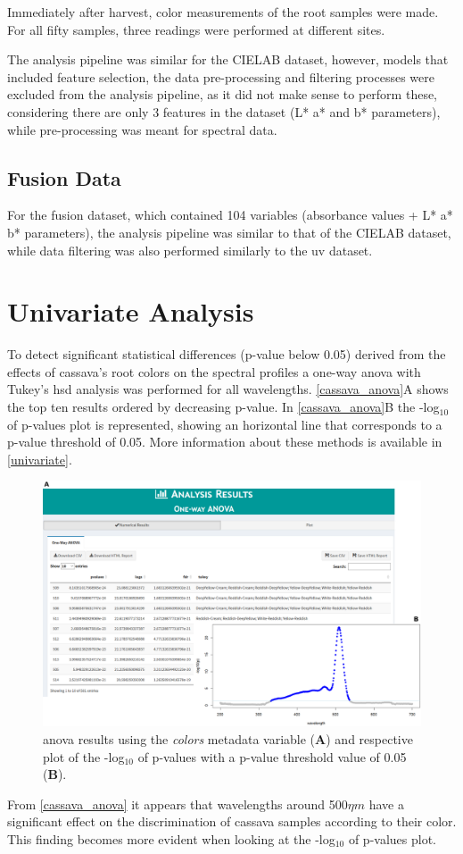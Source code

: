 Immediately after harvest, color measurements of the root samples were made. For all fifty samples, three readings were performed at different sites.

The analysis pipeline was similar for the CIELAB dataset, however, models that included feature selection, the data pre-processing and filtering processes were excluded from the analysis pipeline, as it did not make sense to perform these, considering there are only 3 features in the dataset (L* a* and b* parameters), while pre-processing was meant for spectral data.

\subsection{Fusion Data}

For the fusion dataset, which contained 104 variables (absorbance values + L* a* b* parameters), the analysis pipeline was similar to that of the CIELAB dataset, while data filtering was also performed similarly to the \gls{uv} dataset.


\section{Univariate Analysis}

To detect significant statistical differences (p-value below 0.05) derived from the effects of cassava's root colors on the spectral profiles a one-way \gls{anova} with Tukey's \gls{hsd} analysis was performed for all wavelengths. \autoref{cassava_anova}A shows the top ten results ordered by decreasing p-value. In \autoref{cassava_anova}B the -log$_{10}$ of p-values plot is represented, showing an horizontal line that corresponds to a p-value threshold of 0.05. More information about these methods is available in \autoref{univariate}.

\begin{figure}[h]
	\centering
	\includegraphics[width=1\linewidth]{Imagens/Case_study/anova_table_plot}
	\caption{\gls{anova} results using the \textit{colors} metadata variable (\textbf{A}) and respective plot of the -log$_{10}$ of p-values with a p-value threshold value of 0.05 (\textbf{B}).}
	\label{cassava_anova}
\end{figure}

From \autoref{cassava_anova} it appears that wavelengths around 500$\eta m$ have a significant effect on the discrimination of cassava samples according to their color. This finding becomes more evident when looking at the -log$_{10}$ of p-values plot.




